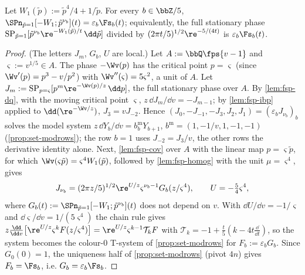 
\begin{lem}
\label{lem:con-S2}
Let $W_1(\tilde p):=\tilde p^4/4+1/\tilde p$. For every $b\in\bbZ/5$, $\SPn_{\tilde p=1}[-W_1;\tilde p^{\nu_b}](t)=\varepsilon_b\Fs_b(t)$; equivalently, the full stationary phase $\mathrm{SP}_{\tilde p=1}[\tilde p^{\nu_b}\re^{-W_1(\tilde p)/t}\,\dd\tilde p]$ divided by $(2\pi t/5)^{1/2}\re^{-5/(4t)}$ is $\varepsilon_b\Fs_b(t)$.
\end{lem}

\begin{proof}
(The letters $J_m$, $G_b$, $U$ are local.) Let $A:=\bbQ\fps{v-1}$ and $\varsigma:=v^{1/5}\in A$. The phase $-\Wv(p)$ has the critical point $p=\varsigma$ (since $\Wv'(p)=p^3-v/p^2$) with $\Wv''(\varsigma)=5\varsigma^2$, a unit of $A$. Let $J_m:=\mathrm{SP}_{p=\varsigma}[p^m\re^{-\Wv(p)/z}\,\dd p]$, the full stationary phase over $A$. By \cref{lem:fsp-dq}, with the moving critical point $\varsigma$, $z\,\dd J_m/\dd v=-J_{m-1}$; by \cref{lem:fsp-ibp} applied to $\dd(\re^{-\Wv/z})$, $J_3=vJ_{-2}$. Hence $(J_0,-J_{-1},-J_3,J_2,J_1)=(\varepsilon_bJ_{\nu_b})_b$ solves the model system $z\,\dd Y_b/\dd v=b^{\mathrm m}_bY_{b+1}$, $b^{\mathrm m}=(1,-1/v,1,-1,-1)$ (\cref{prop:set-modrows}); the row $b=1$ uses $J_{-2}=J_3/v$, the other rows the derivative identity alone. Next, \cref{lem:fsp-cov} over $A$ with the linear map $p=\varsigma\tilde p$, for which $\Wv(\varsigma\tilde p)=\varsigma^4W_1(\tilde p)$, followed by \cref{lem:fsp-homog} with the unit $\mu=\varsigma^4$, gives
\[
J_{\nu_b}=(2\pi z/5)^{1/2}\re^{U/z}\varsigma^{\nu_b-1}G_b(z/\varsigma^4),\qquad U=-\tfrac54\varsigma^4,
\]
where $G_b(t):=\SPn_{\tilde p=1}[-W_1;\tilde p^{\nu_b}](t)$ does not depend on $v$. With $\dd U/\dd v=-1/\varsigma$ and $\dd\varsigma/\dd v=1/(5\varsigma^4)$ the chain rule gives $z\frac{\dd}{\dd v}\bigl[\re^{U/z}\varsigma^{k}F(z/\varsigma^4)\bigr]=\re^{U/z}\varsigma^{k-1}\mathcal T_kF$ with $\mathcal T_k=-1+\frac t5(k-4t\frac{\dd}{\dd t})$, so the system becomes the colour-$0$ T-system of \cref{prop:set-modrows} for $F_b:=\varepsilon_bG_b$. Since $G_0(0)=1$, the uniqueness half of \cref{prop:set-modrows} (pivot $4n$) gives $F_b=\Fs_b$, i.e. $G_b=\varepsilon_b\Fs_b$.
\end{proof}

